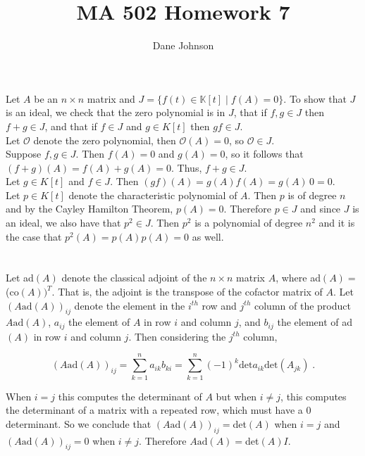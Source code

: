 \documentclass[11pt]{article}
\title{MA 502 Homework 7}
\author{Dane Johnson}
\begin{document}
\maketitle

\section{}

Let $A$ be an $n\times n$ matrix and $J = \{f(t) \in \mathbb{K}[t] \; | \; f(A) = 0\}$. To show that $J$ is an ideal, we check that the zero polynomial is in $J$, that if $f,g \in J$ then $f+g \in J$, and that if $f \in J$ and $g \in K[t]$ then $gf \in J$. \\

Let $\mathcal{O}$ denote the zero polynomial, then $\mathcal{O}(A) = 0$, so $\mathcal{O} \in J$. \\

Suppose $f,g \in J$. Then $f(A) = 0$ and $g(A) = 0$, so it follows that $(f+g)(A) = f(A) + g(A) = 0$. Thus, $f+g \in J$. \\

Let $g \in K[t]$ and $f \in J$. Then $(gf)(A) = g(A)f(A) = g(A) \, 0 = 0$. \\

Let $p \in K[t]$ denote the characteristic polynomial of $A$. Then $p$ is of degree $n$ and by the Cayley Hamilton Theorem, $p(A) = 0$. Therefore $p \in J$ and since $J$ is an ideal, we also have that $p^2 \in J$. Then $p^2$ is a polynomial of degree $n^2$ and it is the case that $p^2(A) = p(A)p(A) = 0$ as well.

\section{}

Let ad$(A)$ denote the classical adjoint of the $n \times n$ matrix $A$, where ad$(A) = $(co$(A))^T$. That is, the adjoint is the transpose of the cofactor matrix of $A$. Let $(A\text{ad}(A))_{ij}$ denote the element in the $i^{th}$ row and $j^{th}$ column of the product $A\text{ad}(A)$, $a_{ij}$ the element of $A$ in row $i$ and column $j$, and $b_{ij}$ the element of ad$(A)$ in row $i$ and column $j$. Then considering the $j^{th}$ column,

$$ (A\text{ad}(A))_{ij} = \sum_{k=1}^n a_{ik}b_{ki} = \sum_{k=1}^n (-1)^k \text{det} a_{ik}\text{det}(A_{jk})\;.$$

When $i = j$ this computes the determinant of $A$ but when $i \neq j$, this computes the determinant of a matrix with a repeated row, which must have a 0 determinant. So we conclude that $(A\text{ad}(A))_{ij} = $det$(A)$ when $i = j$ and $(A\text{ad}(A))_{ij} = 0$ when $i \neq j$. Therefore $A\text{ad}(A) = $det$(A)I$. \\
\end{document}
